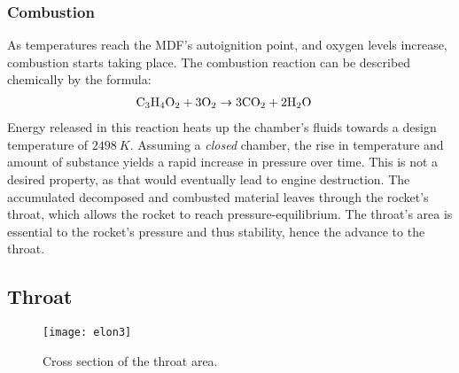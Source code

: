 	\subsubsection{Combustion}

		As temperatures reach the MDF's autoignition point, and oxygen levels increase, combustion starts taking place. The combustion reaction can be described chemically by the formula:
			\begin{align}
				\mathrm{C_3 H_4 O_2 + 3 O_2} &\rightarrow \mathrm{3 CO_2 + 2H_2O}
			\end{align}
		Energy released in this reaction heats up the chamber's fluids towards a design temperature of $\SI{2498}{K}$. Assuming a \emph{closed} chamber, the rise in temperature and amount of substance yields a rapid increase in pressure over time. This is not a desired property, as that would eventually lead to engine destruction. The accumulated decomposed and combusted material leaves through the rocket's throat, which allows the rocket to reach pressure-equilibrium. The throat's area is essential to the rocket's pressure and thus stability, hence the advance to the throat.

\subsection{Throat}

	\begin{figure}
		\texttt{[image: elon3]}
		\caption{Cross section of the throat area.}
		\label{fig:crossthroat}
	\end{figure}

